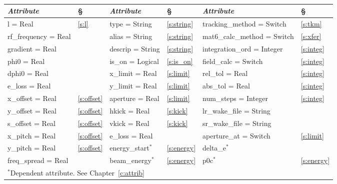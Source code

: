 {{\begin{center}
\tt
\begin{tabular}{|l|l||l|l||l|l|} \hline
  {\sl Attribute} & \S  & {\sl Attribute} & \S & {\sl Attribute} & \S \\ \hline
  l        = Real       & \ref{s:l}      & type = String     & \ref{s:string} & tracking\_method = Switch   & \ref{s:tkm}   \\ \hline
  rf\_frequency = Real  &                & alias = String    & \ref{s:string} & mat6\_calc\_method = Switch & \ref{s:xfer}  \\ \hline
  gradient      = Real  &                & descrip = String  & \ref{s:string} & integration\_ord = Integer  & \ref{s:integ} \\ \hline
  phi0          = Real  &                & is\_on = Logical  & \ref{s:is_on}  & field\_calc = Switch        & \ref{s:integ} \\ \hline
  dphi0         = Real  &                & x\_limit = Real   & \ref{s:limit}  & rel\_tol = Real             & \ref{s:integ} \\ \hline
  e\_loss    = Real     &                & y\_limit = Real   & \ref{s:limit}  & abs\_tol = Real             & \ref{s:integ} \\ \hline
  x\_offset  = Real     & \ref{s:offset} & aperture = Real   & \ref{s:limit}  & num\_steps = Integer        & \ref{s:integ} \\ \hline
  y\_offset  = Real     & \ref{s:offset} & hkick    = Real   & \ref{s:kick}   & lr\_wake\_file = String     &               \\ \hline
  s\_offset  = Real     & \ref{s:offset} & vkick    = Real   & \ref{s:kick}   & sr\_wake\_file = String     &               \\ \hline
  x\_pitch = Real       & \ref{s:offset} & e\_loss  = Real   &                & aperture\_at = Switch       & \ref{s:limit} \\ \hline
  y\_pitch = Real       & \ref{s:offset} & energy\_start$^*$ & \ref{s:energy} & delta\_e$^*$                &               \\ \hline
  freq\_spread = Real   &                & beam\_energy$^*$  & \ref{s:energy} & p0c$^*$                     & \ref{s:energy}\\ \hline
  \multicolumn{6}{l}{\small $^*$Dependent attribute. See Chapter~\ref{c:attrib}} \\
\end{tabular}
\end{center}
\toffset

}}
